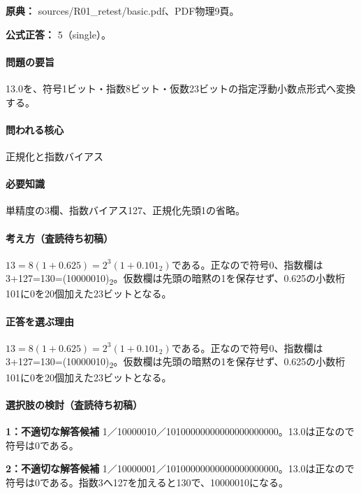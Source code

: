 \noindent\textbf{原典：} sources/R01\_retest/basic.pdf、PDF物理9頁。

\textbf{公式正答：} 5（single）。

\paragraph{問題の要旨} 13.0を、符号1ビット・指数8ビット・仮数23ビットの指定浮動小数点形式へ変換する。

\paragraph{問われる核心} 正規化と指数バイアス

\paragraph{必要知識} 単精度の3欄、指数バイアス127、正規化先頭1の省略。

\paragraph{考え方（査読待ち初稿）} \(13=8(1+0.625)=2^3(1+0.101_2)\)である。正なので符号0、指数欄は3+127=\allowbreak{}130=\allowbreak{}(10000010)\textsubscript{2}。仮数欄は先頭の暗黙の1を保存せず、0.625の小数桁101に0を20個加えた23ビットとなる。

\paragraph{正答を選ぶ理由} \(13=8(1+0.625)=2^3(1+0.101_2)\)である。正なので符号0、指数欄は3+127=\allowbreak{}130=\allowbreak{}(10000010)\textsubscript{2}。仮数欄は先頭の暗黙の1を保存せず、0.625の小数桁101に0を20個加えた23ビットとなる。

\paragraph{選択肢の検討（査読待ち初稿）}\mbox{}\par

\noindent\textbf{1：不適切な解答候補} 1／10000010／10100000000000000000000。13.0は正なので符号は0である。\par

\noindent\textbf{2：不適切な解答候補} 1／10000001／10100000000000000000000。13.0は正なので符号は0である。指数3へ127を加えると130で、10000010になる。\par


